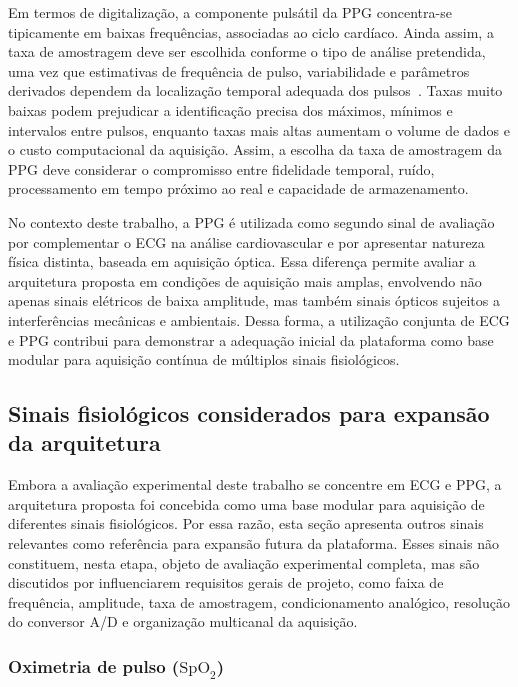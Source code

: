 \documentclass[a4paper,12pt]{fcte}
\begin{document}
Em termos de digitalização, a componente pulsátil da PPG concentra-se tipicamente em baixas frequências, associadas ao ciclo cardíaco. Ainda assim, a taxa de amostragem deve ser escolhida conforme o tipo de análise pretendida, uma vez que estimativas de frequência de pulso, variabilidade e parâmetros derivados dependem da localização temporal adequada dos pulsos~\cite{beres2021ppg_sampling}. Taxas muito baixas podem prejudicar a identificação precisa dos máximos, mínimos e intervalos entre pulsos, enquanto taxas mais altas aumentam o volume de dados e o custo computacional da aquisição. Assim, a escolha da taxa de amostragem da PPG deve considerar o compromisso entre fidelidade temporal, ruído, processamento em tempo próximo ao real e capacidade de armazenamento.

No contexto deste trabalho, a PPG é utilizada como segundo sinal de avaliação por complementar o ECG na análise cardiovascular e por apresentar natureza física distinta, baseada em aquisição óptica. Essa diferença permite avaliar a arquitetura proposta em condições de aquisição mais amplas, envolvendo não apenas sinais elétricos de baixa amplitude, mas também sinais ópticos sujeitos a interferências mecânicas e ambientais. Dessa forma, a utilização conjunta de ECG e PPG contribui para demonstrar a adequação inicial da plataforma como base modular para aquisição contínua de múltiplos sinais fisiológicos.

\subsection{Sinais fisiológicos considerados para expansão da arquitetura}

Embora a avaliação experimental deste trabalho se concentre em ECG e PPG, a arquitetura proposta foi concebida como uma base modular para aquisição de diferentes sinais fisiológicos. Por essa razão, esta seção apresenta outros sinais relevantes como referência para expansão futura da plataforma. Esses sinais não constituem, nesta etapa, objeto de avaliação experimental completa, mas são discutidos por influenciarem requisitos gerais de projeto, como faixa de frequência, amplitude, taxa de amostragem, condicionamento analógico, resolução do conversor A/D e organização multicanal da aquisição.

\subsubsection{\texorpdfstring{Oximetria de pulso ($\mathrm{SpO}_2$)}{Oximetria de pulso (SpO2)}}
\end{document}
